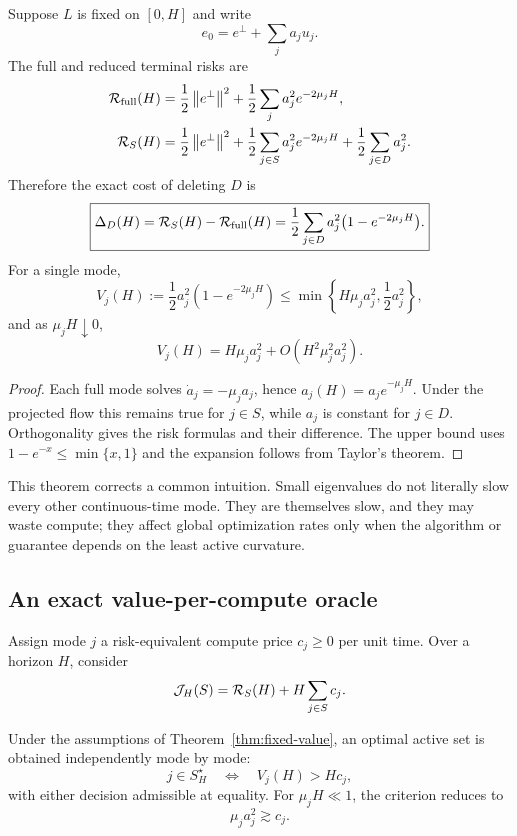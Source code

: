 \begin{theorem}\label{thm:fixed-value}
Suppose $L$ is fixed on $[0,H]$ and write
\[
e_0=e^\perp+\sum_j a_ju_j.
\]
The full and reduced terminal risks are
\begin{align*}
\mathcal R_{\rm full}(H)
&=\frac12\left\lVert e^\perp\right\rVert^2
+\frac12\sum_j a_j^2e^{-2\mu_jH},\\
\mathcal R_S(H)
&=\frac12\left\lVert e^\perp\right\rVert^2
+\frac12\sum_{j\in S}a_j^2e^{-2\mu_jH}
+\frac12\sum_{j\in D}a_j^2.
\end{align*}
Therefore the exact cost of deleting $D$ is
\[
\boxed{
\Delta_D(H)=\mathcal R_S(H)-\mathcal R_{\rm full}(H)
=\frac12\sum_{j\in D}a_j^2\bigl(1-e^{-2\mu_jH}\bigr).}
\]
For a single mode,
\[
V_j(H):=\frac12a_j^2(1-e^{-2\mu_jH})
\le \min\left\{H\mu_ja_j^2,\frac12a_j^2\right\},
\]
and as $\mu_jH\downarrow0$,
\[
V_j(H)=H\mu_ja_j^2+O(H^2\mu_j^2a_j^2).
\]
\end{theorem}

\begin{proof}
Each full mode solves $\dot a_j=-\mu_ja_j$, hence $a_j(H)=a_je^{-\mu_jH}$. Under the projected flow this remains true for $j\in S$, while $a_j$ is constant for $j\in D$. Orthogonality gives the risk formulas and their difference. The upper bound uses $1-e^{-x}\le\min\{x,1\}$ and the expansion follows from Taylor's theorem.
\end{proof}

This theorem corrects a common intuition. Small eigenvalues do not literally slow every other continuous-time mode. They are themselves slow, and they may waste compute; they affect global optimization rates only when the algorithm or guarantee depends on the least active curvature.

\subsection{An exact value-per-compute oracle}
Assign mode $j$ a risk-equivalent compute price $c_j\ge0$ per unit time. Over a horizon $H$, consider
\[
\mathcal J_H(S)=\mathcal R_S(H)+H\sum_{j\in S}c_j.
\]

\begin{corollary}\label{cor:value-compute}
Under the assumptions of Theorem~\ref{thm:fixed-value}, an optimal active set is obtained independently mode by mode:
\[
\boxed{j\in S_H^\star\quad\Longleftrightarrow\quad V_j(H)>Hc_j,}
\]
with either decision admissible at equality. For $\mu_jH\ll1$, the criterion reduces to
\[
\mu_ja_j^2\gtrsim c_j.
\]
\end{corollary}

